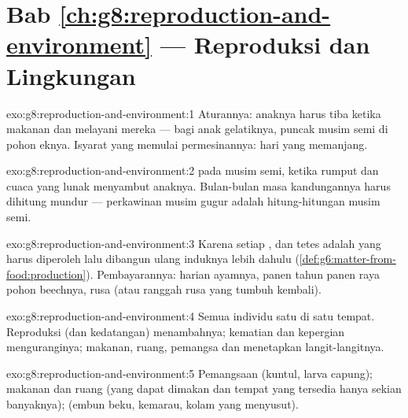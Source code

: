 \section*{Bab \ref{ch:g8:reproduction-and-environment} --- Reproduksi dan Lingkungan}

\begin{solution}{exo:g8:reproduction-and-environment:1}
Aturannya: anaknya harus tiba ketika makanan dan  melayani
mereka --- bagi anak gelatiknya, puncak  musim semi di pohon
eknya. Isyarat yang memulai permesinannya: hari yang memanjang.
\end{solution}

\begin{solution}{exo:g8:reproduction-and-environment:2}
 pada musim semi, ketika rumput dan cuaca yang lunak
menyambut anaknya. Bulan-bulan masa kandungannya harus dihitung mundur
--- perkawinan musim gugur adalah hitung-hitungan musim semi.
\end{solution}

\begin{solution}{exo:g8:reproduction-and-environment:3}
Karena setiap ,  dan tetes  adalah  yang
harus diperoleh lalu dibangun ulang induknya lebih dahulu
(\cref{def:g6:matter-from-food:production}). Pembayarannya: 
harian ayamnya, panen  tahun panen raya pohon beechnya,  rusa
 (atau ranggah rusa  yang tumbuh kembali).
\end{solution}

\begin{solution}{exo:g8:reproduction-and-environment:4}
Semua individu satu  di satu tempat. Reproduksi (dan
kedatangan) menambahnya; kematian dan kepergian menguranginya; makanan,
ruang, pemangsa dan  menetapkan langit-langitnya.
\end{solution}

\begin{solution}{exo:g8:reproduction-and-environment:5}
Pemangsaan (kuntul, larva capung); makanan dan ruang (yang dapat
dimakan dan tempat yang tersedia hanya sekian banyaknya); 
(embun beku, kemarau, kolam yang menyusut).
\end{solution}

